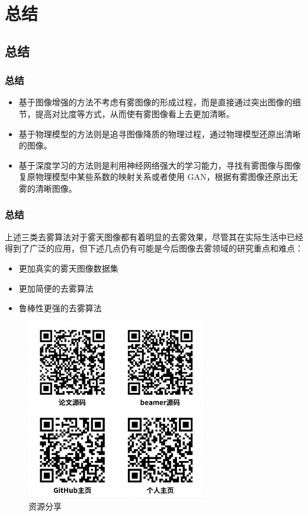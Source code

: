     \section{总结}
    \subsection{总结}

    \begin{frame}
      \frametitle{总结}
      \begin{itemize}
        \item 基于图像增强的方法不考虑有雾图像的形成过程，而是直接通过突出图像的细节，提高对比度等方式，从而使有雾图像看上去更加清晰。
        \item 基于物理模型的方法则是追寻图像降质的物理过程，通过物理模型还原出清晰的图像。
        \item 基于深度学习的方法则是利用神经网络强大的学习能力，寻找有雾图像与图像复原物理模型中某些系数的映射关系或者使用 GAN，根据有雾图像还原出无雾的清晰图像。
      \end{itemize}
    \end{frame}

    \begin{frame}
      \frametitle{总结}
      上述三类去雾算法对于雾天图像都有着明显的去雾效果，尽管其在实际生活中已经得到了广泛的应用，但下述几点仍有可能是今后图像去雾领域的研究重点和难点：
      \begin{itemize}
        \item 更加真实的雾天图像数据集
        \item 更加简便的去雾算法
        \item 鲁棒性更强的去雾算法
      \end{itemize}
    \end{frame}

    \begin{frame}
      \begin{figure}
        \centering
        \includegraphics[width=0.7\textwidth]{figures/fusion.png}
        \caption{资源分享}
        \end{figure}
    \end{frame}


